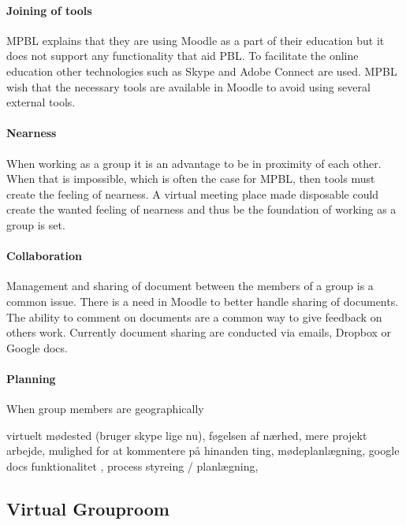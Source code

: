 \paragraph{Joining of tools} MPBL explains that they are using Moodle as a part of their education but it does not support any functionality that aid PBL. 
To facilitate the online education other technologies such as Skype\cite{skype} and Adobe Connect\cite{adobe} are used. 
MPBL wish that the necessary tools are available in Moodle to avoid using several external tools.     

\paragraph{Nearness} When working as a group it is an advantage to be in proximity of each other. When that is impossible, which is often the case for MPBL, then tools must create the feeling of nearness. 
A virtual meeting place made disposable could create the wanted feeling of nearness and thus be the foundation of working as a group is set. 

\paragraph{Collaboration} Management and sharing of document between the members of a group is a common issue. 
There is a need in Moodle to better handle sharing of documents. The ability to comment on documents are a common way to give feedback on others work. 
Currently document sharing are conducted via emails, Dropbox\cite{dropbox} or Google docs\cite{googledocs}.


\paragraph{Planning} When group members are geographically 






virtuelt mødested (bruger skype lige nu), føgelsen af nærhed, mere projekt arbejde, mulighed for at kommentere på hinanden ting, mødeplanlægning, google docs funktionalitet , process styreing / planlægning, 

\subsection{Virtual Grouproom}



